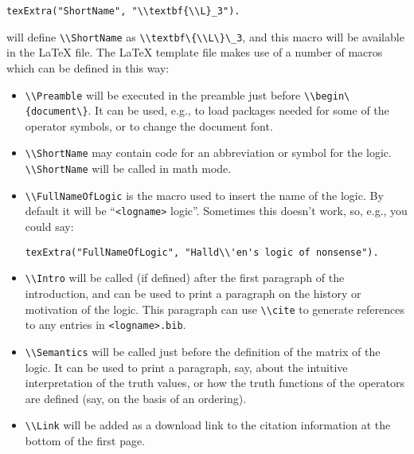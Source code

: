 \documentclass[]{article}
\newcommand{\passthrough}[1]{#1}
\begin{document}
\begin{itemize}
\begin{lstlisting}
texExtra("ShortName", "\\textbf{\\L}_3").
\end{lstlisting}

  will define \passthrough{\lstinline!\\ShortName!} as
  \passthrough{\lstinline!\\textbf\{\\L\}\_3!}, and this macro will be
  available in the LaTeX file. The LaTeX template file makes use of a
  number of macros which can be defined in this way:

  \begin{itemize}
  \item
    \passthrough{\lstinline!\\Preamble!} will be executed in the
    preamble just before \passthrough{\lstinline!\\begin\{document\}!}.
    It can be used, e.g., to load packages needed for some of the
    operator symbols, or to change the document font.
  \item
    \passthrough{\lstinline!\\ShortName!} may contain code for an
    abbreviation or symbol for the logic.
    \passthrough{\lstinline!\\ShortName!} will be called in math mode.
  \item
    \passthrough{\lstinline!\\FullNameOfLogic!} is the macro used to
    insert the name of the logic. By default it will be
    ``\passthrough{\lstinline!<logname>!} logic''. Sometimes this
    doesn't work, so, e.g., you could say:

\begin{lstlisting}
texExtra("FullNameOfLogic", "Halld\\'en's logic of nonsense").
\end{lstlisting}
  \item
    \passthrough{\lstinline!\\Intro!} will be called (if defined) after
    the first paragraph of the introduction, and can be used to print a
    paragraph on the history or motivation of the logic. This paragraph
    can use \passthrough{\lstinline!\\cite!} to generate references to
    any entries in \passthrough{\lstinline!<logname>.bib!}.
  \item
    \passthrough{\lstinline!\\Semantics!} will be called just before the
    definition of the matrix of the logic. It can be used to print a
    paragraph, say, about the intuitive interpretation of the truth
    values, or how the truth functions of the operators are defined
    (say, on the basis of an ordering).
  \item
    \passthrough{\lstinline!\\Link!} will be added as a download link to
    the citation information at the bottom of the first page.
  \end{itemize}
\end{itemize}
\end{document}
